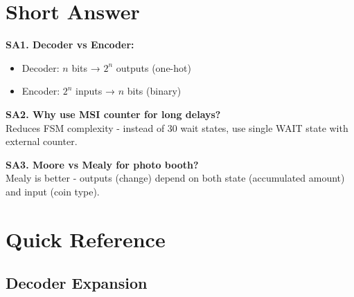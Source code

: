 \documentclass[12pt,a4paper]{article}
\begin{document}
\section{Short Answer}

\textbf{SA1. Decoder vs Encoder:}
\begin{itemize}
  \item Decoder: $n$ bits → $2^n$ outputs (one-hot)
  \item Encoder: $2^n$ inputs → $n$ bits (binary)
\end{itemize}

\textbf{SA2. Why use MSI counter for long delays?}\\
Reduces FSM complexity - instead of 30 wait states, use single WAIT state with external counter.

\textbf{SA3. Moore vs Mealy for photo booth?}\\
Mealy is better - outputs (change) depend on both state (accumulated amount) and input (coin type).

\newpage
\appendix
\section{Quick Reference}

\subsection{Decoder Expansion}
\end{document}
